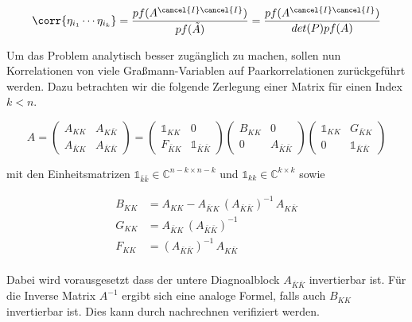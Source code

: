\begin{equation}
\corr{\eta_{i_1} \cdots \eta_{i_k}}  = \frac{pf(A^{\cancel{I} \cancel{I}}) }{pf(\tilde A)} = \frac{pf(A^{\cancel{I} \cancel{I}}) }{det(P) pf(A)}
\end{equation}

\noindent Um das Problem analytisch besser zugänglich zu machen, sollen nun Korrelationen von viele Graßmann-Variablen auf Paarkorrelationen zurückgeführt werden. Dazu betrachten wir die folgende Zerlegung einer Matrix für einen Index $k<n$.

\begin{equation}
    A = 
    \left(\begin{array}{cc} 
        A_{K K}      &  A_{K \bar K} \\
        A_{\bar K K} &  A_{\bar K \bar K}
    \end{array}\right)
      = 
    \left(\begin{array}{cc} 
        \mathds{1}_{K K}      &  0 \\
        F_{\bar K K} &  \mathds{1}_{\bar K \bar K}
    \end{array}\right)
    \left(\begin{array}{cc} 
        B_{K K}      &  0 \\
        0 &  A_{\bar K \bar K}
    \end{array}\right)
    \left(\begin{array}{cc} 
        \mathds{1}_{K K}      &  G_{\bar K K} \\
         0  &  \mathds{1}_{\bar K \bar K}
    \end{array}\right)
\end{equation}

\noindent mit den Einheitsmatrizen $\mathds{1}_{\bar k \bar k} \in \mathbb{C}^{n-k \times n-k} $ und $\mathds{1}_{k k} \in \mathbb{C}^{k \times k} $ sowie

\begin{align}
B_{KK} &= A_{KK} - A_{\bar K K}\, (A_{\bar K \bar K})^{-1} \,A_{K \bar K} \\
G_{KK} &= A_{\bar K K}\, (A_{\bar K \bar K})^{-1} \\
F_{KK} &= (A_{\bar K \bar K})^{-1} \,A_{K \bar K} \\
\end{align}

\noindent Dabei wird vorausgesetzt dass der untere Diagnoalblock $A_{\bar K \bar K}$ invertierbar ist. Für die Inverse Matrix $A^{-1}$ ergibt sich eine analoge Formel, falls auch $B_{KK}$ invertierbar ist. Dies kann durch nachrechnen verifiziert werden.

